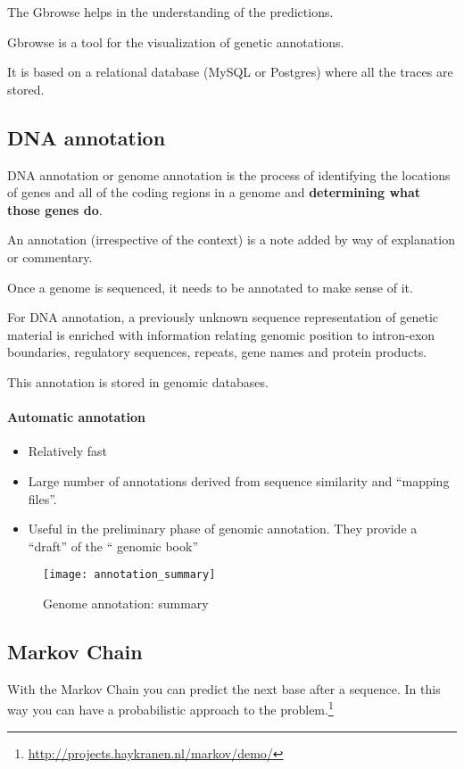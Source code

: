 The Gbrowse helps in the understanding of the predictions.

Gbrowse is a tool for the visualization of genetic annotations.

It is based on a relational database (MySQL or Postgres) where all the traces
are stored.

\subsection{DNA annotation}

DNA annotation or genome annotation is the process of identifying the
locations of genes and all of the coding regions in a genome and
\textbf{determining what those genes do}.

An annotation (irrespective of the context) is a note added by way of
explanation or commentary.

Once a genome is sequenced, it needs to be annotated to make sense of it.

For DNA annotation, a previously unknown sequence representation of genetic
material is enriched with information relating genomic position to intron-exon
boundaries, regulatory sequences, repeats, gene names and protein products.

This annotation is stored in genomic databases.

\paragraph{Automatic annotation}

\begin{itemize}
 \item Relatively fast
 \item Large number of annotations derived from sequence similarity and
``mapping files''.
 \item Useful in the preliminary phase of genomic annotation. They provide a
``draft'' of the `` genomic book''
\end{itemize}

\begin{figure}[H]
  \centering
  \texttt{[image: annotation\_summary]}
  \caption{Genome annotation: summary}
  \label{fig:annotation_summary}
\end{figure}

\subsection{Markov Chain}
With the Markov Chain you can predict the next base after a sequence. In this
way you can have a probabilistic approach to the
problem.\footnote{\url{http://projects.haykranen.nl/markov/demo/}}
